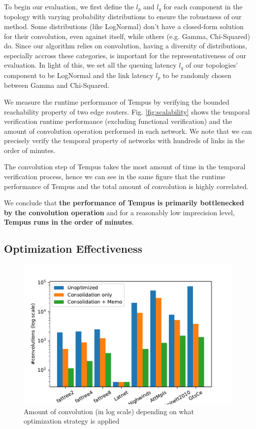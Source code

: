 \documentclass[10pt,sigconf,letterpaper,anonymous,nonacm]{acmart}
\begin{document}
To begin our evaluation, we first define the $l_p$ and $l_q$ for each component in 
the topology with varying probability distributions to ensure the robustness of our method.
Some distributions (like LogNormal) don't have a closed-form solution for their convolution, even 
against itself, while others (e.g. Gamma, Chi-Squared) do.
Since our algorithm relies on convolution, having a diversity of distributions, especially accross
these categories, is important for the representativeness of our evaluation.
In light of this, we set all the queuing latency $l_q$ of our topologies' component to be LogNormal 
and the link latency $l_p$ to be randomly chosen between Gamma and Chi-Squared. 

We measure the runtime performance of Tempus by verifying the bounded reachability property of two 
edge routers.
Fig. \ref{fig:scalability} shows the temporal verification runtime performance (excluding functional 
verification) and the amount of convolution operation performed in each network.
We note that we can precisely verify the temporal property of networks with hundreds of links in 
the order of minutes.

The convolution step of Tempus takes the most amount of time in the temporal verification process, 
hence we can see in the same figure that the runtime performance of Tempus and the total amount 
of convolution is highly correlated.

We conclude that \textbf{the performance of Tempus is primarily bottlenecked by the convolution 
operation} and for a reasonably low imprecision level, \textbf{Tempus runs in the order of 
minutes}.

\subsection{Optimization Effectiveness}

\begin{figure}[h]
    \centering
    \includegraphics[scale=0.5]{optimization}
    \caption{Amount of convolution (in log scale) depending on what optimization strategy is applied}
    \label{fig:opt}
\end{figure}
\end{document}
